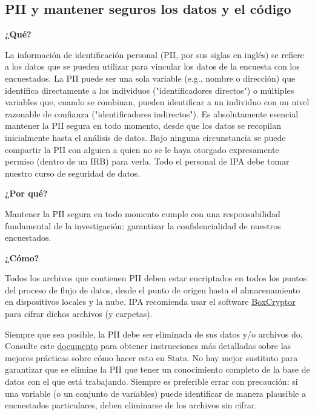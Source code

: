 \documentclass[11pt,en]{elegantpaper}
\begin{document}
\begin{enumerate}
\newpage 
\section{PII y mantener seguros los datos y el código}
\label{sec:pii}

\noindent
\textbf{¿Qué?}

La información de identificación personal (PII, por sus siglas en inglés) se refiere a los datos que se pueden utilizar para vincular los datos de la encuesta con los encuestados. La PII puede ser una sola variable (e.g., nombre o dirección) que identifica directamente a los individuos ("identificadores directos") o múltiples variables que, cuando se combinan, pueden identificar a un individuo con un nivel razonable de confianza ("identificadores indirectos"). Es absolutamente esencial mantener la PII segura en todo momento, desde que los datos se recopilan inicialmente hasta el análisis de datos. Bajo ninguna circunstancia se puede compartir la PII con alguien a quien no se le haya otorgado expresamente permiso (dentro de un IRB) para verla. Todo el personal de IPA debe tomar nuestro curso de seguridad de datos.

\noindent
\textbf{¿Por qué?}

Mantener la PII segura en todo momento cumple con una responsabilidad fundamental de la investigación: garantizar la confidencialidad de nuestros encuestados.

\noindent
\textbf{¿Cómo?} 

Todos los archivos que contienen PII deben estar encriptados en todos los puntos del proceso de flujo de datos, desde el punto de origen hasta el almacenamiento en dispositivos locales y la nube. IPA recomienda usar el software \href{https://www.boxcryptor.com/}{BoxCryptor} para cifrar dichos archivos (y carpetas).

Siempre que sea posible, la PII debe ser eliminada de sus datos y/o archivos do. Consulte este \href{http://www.poverty-action.org/research-transparency/pii-searching}{documento} para obtener instrucciones más detalladas sobre las mejores prácticas sobre cómo hacer esto en Stata. No hay mejor sustituto para garantizar que se elimine la PII que tener un conocimiento completo de la base de datos con el que está trabajando. Siempre es preferible errar con precaución: si una variable (o un conjunto de variables) puede identificar de manera plausible a encuestados particulares, deben eliminarse de los archivos sin cifrar.


\end{enumerate}
\end{document}
